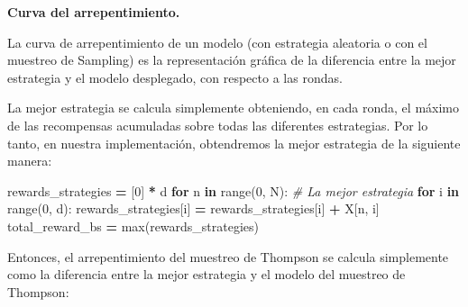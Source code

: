 \documentclass[
]{book}
\newenvironment{Shaded}{\begin{snugshade}}{\end{snugshade}}
\newcommand{\BuiltInTok}[1]{#1}
\newcommand{\CommentTok}[1]{\textcolor[rgb]{0.56,0.35,0.01}{\textit{#1}}}
\newcommand{\ControlFlowTok}[1]{\textcolor[rgb]{0.13,0.29,0.53}{\textbf{#1}}}
\newcommand{\DecValTok}[1]{\textcolor[rgb]{0.00,0.00,0.81}{#1}}
\newcommand{\KeywordTok}[1]{\textcolor[rgb]{0.13,0.29,0.53}{\textbf{#1}}}
\newcommand{\NormalTok}[1]{#1}
\newcommand{\OperatorTok}[1]{\textcolor[rgb]{0.81,0.36,0.00}{\textbf{#1}}}
\begin{document}
\textbf{Curva del arrepentimiento.}

La curva de arrepentimiento de un modelo (con estrategia aleatoria o con el muestreo de Sampling) es la representación gráfica de la diferencia entre la mejor estrategia y el modelo desplegado, con respecto a las rondas.

La mejor estrategia se calcula simplemente obteniendo, en cada ronda, el máximo de las recompensas acumuladas sobre todas las diferentes estrategias. Por lo tanto, en nuestra implementación, obtendremos la mejor estrategia de la siguiente manera:

\begin{Shaded}
\begin{Highlighting}[]
\NormalTok{rewards\_strategies }\OperatorTok{=}\NormalTok{ [}\DecValTok{0}\NormalTok{] }\OperatorTok{*}\NormalTok{ d}
\ControlFlowTok{for}\NormalTok{ n }\KeywordTok{in} \BuiltInTok{range}\NormalTok{(}\DecValTok{0}\NormalTok{, N):}
    \CommentTok{\# La mejor estrategia}
    \ControlFlowTok{for}\NormalTok{ i }\KeywordTok{in} \BuiltInTok{range}\NormalTok{(}\DecValTok{0}\NormalTok{, d):}
\NormalTok{        rewards\_strategies[i] }\OperatorTok{=}\NormalTok{ rewards\_strategies[i] }\OperatorTok{+}\NormalTok{ X[n, i]}
\NormalTok{    total\_reward\_bs }\OperatorTok{=} \BuiltInTok{max}\NormalTok{(rewards\_strategies)}
\end{Highlighting}
\end{Shaded}

Entonces, el arrepentimiento del muestreo de Thompson se calcula simplemente como la diferencia entre la mejor estrategia y el modelo del muestreo de Thompson:
\end{document}
